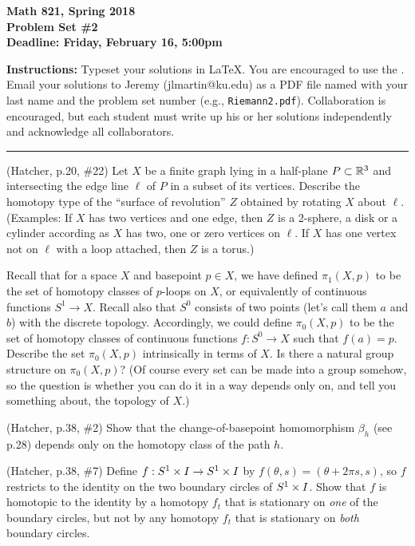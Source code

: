 

\thispagestyle{empty}
{\bf Math 821, Spring 2018\\
Problem Set \#2\\
Deadline: Friday, February 16, 5:00pm}

\textbf{Instructions:} Typeset your solutions in LaTeX.  You are encouraged to use the . Email your solutions to Jeremy (jlmartin@ku.edu) as a PDF file named with your last name and the problem set number (e.g., \texttt{Riemann2.pdf}).  Collaboration is encouraged, but each student must write up his or her solutions independently and acknowledge all collaborators.
\medskip
\hrule

\prob (Hatcher, p.20, \#22) Let $X$ be a finite graph lying in a half-plane $P\subset\mathbb{R}^3$ and intersecting the edge line $\ell$ of $P$ in a subset of its vertices.  Describe the homotopy type of the ``surface of revolution'' $Z$ obtained by rotating $X$ about $\ell$.  (Examples: If $X$ has two vertices and one edge, then $Z$ is a 2-sphere, a disk or a cylinder according as $X$ has two, one or zero vertices on $\ell$.  If $X$ has one vertex not on $\ell$ with a loop attached, then $Z$ is a torus.)


\prob Recall that for a space $X$ and basepoint $p\in X$, we have defined $\pi_1(X,p)$ to be
the set of homotopy classes of $p$-loops on $X$, or equivalently of continuous functions
$S^1\to X$.  Recall also that $S^0$ consists of two points (let's call them $a$ and $b$) with the discrete topology.
Accordingly, we could define $\pi_0(X,p)$ to be the set of homotopy classes of continuous functions $f:S^0\to X$
such that $f(a)=p$.  Describe the set $\pi_0(X,p)$ intrinsically in terms of $X$.  Is there a natural group structure on $\pi_0(X,p)$?
(Of course every set can be made into a group somehow, so the question is whether you can do it in a way depends only on, and tell you something about, the topology of $X$.)

\prob (Hatcher, p.38, \#2) Show that the change-of-basepoint homomorphism $\beta_h$ (see p.28)
depends only on the homotopy class of the path $h$.

\prob (Hatcher, p.38, \#7) Define $f:S^1\times I\to S^1\times I$ by $f(\theta,s)=(\theta+2\pi s,s)$,
so $f$ restricts to the identity on the two boundary circles of $S^1\times I$.   Show that $f$ is homotopic
to the identity by a homotopy $f_t$ that is stationary on \emph{one} of the boundary circles, but not
by any homotopy $f_t$ that is stationary on \emph{both} boundary circles.

